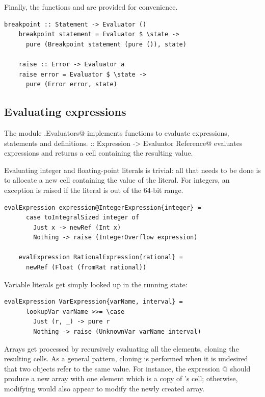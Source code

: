 \documentclass[UdineBachThesis,american,11pt]{PhdThesis}
\begin{document}
  Finally, the functions \lstinline@breakpoint@ and \lstinline@raise@ are
  provided for convenience.

  \begin{lstlisting}[gobble=4,basicstyle=\ttfamily\small]
    breakpoint :: Statement -> Evaluator ()
    breakpoint statement = Evaluator $ \state ->
      pure (Breakpoint statement (pure ()), state)

    raise :: Error -> Evaluator a
    raise error = Evaluator $ \state ->
      pure (Error error, state)
  \end{lstlisting}

  \subsection{Evaluating expressions}

  The module \lstinline@Devin.Evaluators@ implements functions to evaluate
  expressions, statements and definitions.
  \lstinline@evalExpression :: Expression -> Evaluator Reference@ evaluates
  expressions and returns a cell containing the resulting value.

  \newpage

  Evaluating integer and floating-point literals is trivial: all that needs to
  be done is to allocate a new cell containing the value of the literal. For
  integers, an exception is raised if the literal is out of the 64-bit range.

  \begin{lstlisting}[gobble=4,basicstyle=\ttfamily\small]
    evalExpression expression@IntegerExpression{integer} =
      case toIntegralSized integer of
        Just x -> newRef (Int x)
        Nothing -> raise (IntegerOverflow expression)

    evalExpression RationalExpression{rational} =
      newRef (Float (fromRat rational))
  \end{lstlisting}

  Variable literals get simply looked up in the running state:

  \begin{lstlisting}[gobble=4,basicstyle=\ttfamily\small]
    evalExpression VarExpression{varName, interval} =
      lookupVar varName >>= \case
        Just (r, _) -> pure r
        Nothing -> raise (UnknownVar varName interval)
  \end{lstlisting}

  Arrays get processed by recursively evaluating all the elements, cloning the
  resulting cells. As a general pattern, cloning is performed when it is
  undesired that two objects refer to the same value. For instance, the
  expression \lstinline@[x]@ should produce a new array with one element which
  is a copy of \lstinline@x@'s cell; otherwise, modifying \lstinline@x@ would
  also appear to modify the newly created array.
\end{document}
